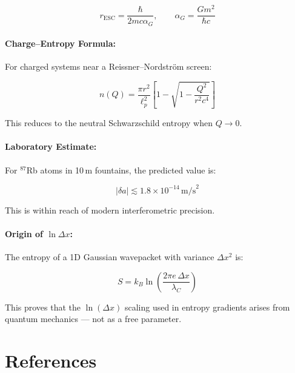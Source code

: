 \documentclass[12pt]{article}
\begin{document}
\[
r_{\text{ESC}} = \frac{\hbar}{2 m c \alpha_G}, \qquad \alpha_G = \frac{G m^2}{\hbar c}
\]

\paragraph{Charge–Entropy Formula:}

For charged systems near a Reissner–Nordström screen:

\[
n(Q) = \frac{\pi r^2}{\ell_p^2} \left[ 1 - \sqrt{1 - \frac{Q^2}{r^2 c^4}} \right]
\]

This reduces to the neutral Schwarzschild entropy when \( Q \rightarrow 0 \).

\paragraph{Laboratory Estimate:}

For $^{87}$Rb atoms in 10 m fountains, the predicted value is:

\[
|\delta a| \lesssim 1.8 \times 10^{-14} \, \text{m/s}^2
\]

This is within reach of modern interferometric precision.

\paragraph{Origin of $\ln \Delta x$:}

The entropy of a 1D Gaussian wavepacket with variance \( \Delta x^2 \) is:

\[
S = k_B \ln \left( \frac{2\pi e \, \Delta x}{\lambda_C} \right)
\]

This proves that the $\ln(\Delta x)$ scaling used in entropy gradients arises from quantum mechanics — not as a free parameter.

\noindent



\section*{References}
\end{document}
